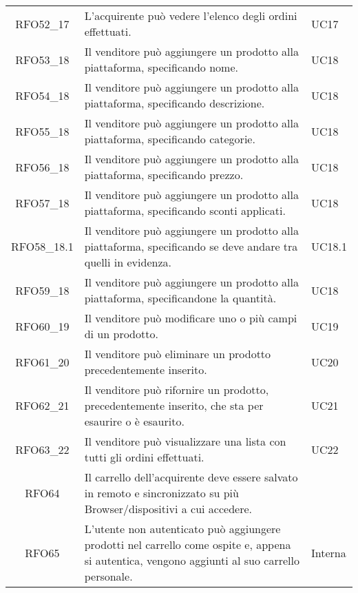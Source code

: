 \begin{longtable}{|c C{9.5cm} C{2.5cm}|}
    RFO52\_17 & L'acquirente può vedere l'elenco degli ordini effettuati. & UC17 \\
    
    RFO53\_18 & Il venditore può aggiungere un prodotto alla piattaforma, specificando nome. & UC18 \\
    
    RFO54\_18 & Il venditore può aggiungere un prodotto alla piattaforma, specificando descrizione. & UC18 \\
    
    RFO55\_18 & Il venditore può aggiungere un prodotto alla piattaforma, specificando categorie. & UC18 \\
    
    RFO56\_18 & Il venditore può aggiungere un prodotto alla piattaforma, specificando prezzo. & UC18 \\
    
    RFO57\_18 & Il venditore può aggiungere un prodotto alla piattaforma, specificando sconti applicati. & UC18 \\
    
    RFO58\_18.1 & Il venditore può aggiungere un prodotto alla piattaforma, specificando se deve andare tra quelli in evidenza. & UC18.1 \\
    
    RFO59\_18 & Il venditore può aggiungere un prodotto alla piattaforma, specificandone la quantità. & UC18 \\
    
    RFO60\_19 & Il venditore può modificare uno o più campi di un prodotto. & UC19 \\
    
    RFO61\_20 & Il venditore può eliminare un prodotto precedentemente inserito. & UC20 \\
    
    RFO62\_21 & Il venditore può rifornire un prodotto, precedentemente inserito, che sta per esaurire o è esaurito. & UC21 \\
    
    RFO63\_22 & Il venditore può visualizzare una lista con tutti gli ordini effettuati. & UC22 \\
    
    RFO64 & Il carrello dell'acquirente deve essere salvato in remoto e sincronizzato su più Browser/dispositivi a cui accedere. &  \\
    
    RFO65 & L'utente non autenticato può aggiungere prodotti nel carrello come ospite e, appena si autentica, vengono aggiunti al suo carrello personale. & Interna \\
    

\end{longtable}
